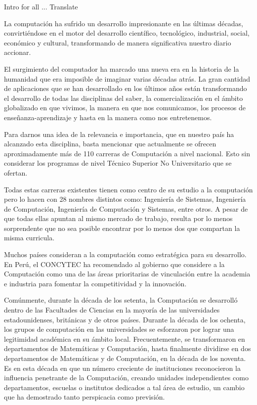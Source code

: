 Intro for all ... Translate

La computación ha sufrido un desarrollo impresionante en las últimas décadas, convirtiéndose en 
el motor del desarrollo científico, tecnológico, industrial, social, económico y cultural, 
transformando de manera significativa nuestro diario accionar.

El surgimiento del computador ha marcado una nueva era en la historia de la humanidad que era 
imposible de imaginar varias décadas atrás. La gran cantidad de aplicaciones que se han desarrollado 
en los últimos años están transformando el desarrollo de todas las disciplinas del saber, 
la comercialización en el ámbito globalizado en que vivimos, la manera en que nos comunicamos, 
los procesos de enseñanza-aprendizaje y hasta en la manera como nos entretenemos.

Para darnos una idea de la relevancia e importancia, que en nuestro país ha alcanzado esta 
disciplina, basta mencionar que actualmente se ofrecen aproximadamente más de 110 carreras de Computación a nivel nacional. 
Esto sin considerar los programas de nivel Técnico Superior No Universitario que se ofertan.

Todas estas carreras existentes tienen como centro de su estudio a la computación pero lo 
hacen con 28 nombres distintos como: Ingeniería de Sistemas, Ingeniería de Computación, 
Ingeniería de Computación y Sistemas, entre otros. A pesar de que todas ellas apuntan al mismo 
mercado de trabajo, resulta por lo menos sorprendente que no sea posible encontrar por lo menos dos 
que compartan la misma curricula.

Muchos países consideran a la computación como estratégica para su desarrollo. En Perú, 
el \ac{CONCYTEC} ha recomendado al gobierno que considere a la Computación como una de las 
áreas prioritarias de vinculación entre la academia e industria para fomentar la 
competitividad y la innovación.

Comúnmente, durante la década de los setenta, la Computación se desarrolló dentro 
de las Facultades de Ciencias en la mayoría de las universidades estadounidenses, 
británicas y de otros países. Durante la década de los ochenta, los grupos de 
computación en las universidades se esforzaron por lograr una legitimidad académica 
en su ámbito local. Frecuentemente, se transformaron en departamentos de Matemáticas y 
Computación, hasta finalmente dividirse en dos departamentos de Matemáticas y de 
Computación, en la década de los noventa. Es en esta década en que un número 
creciente de instituciones reconocieron la influencia penetrante de la Computación, 
creando unidades independientes como departamentos, escuelas o institutos dedicados a 
tal área de estudio, un cambio que ha demostrado tanto perspicacia como previsión. 

